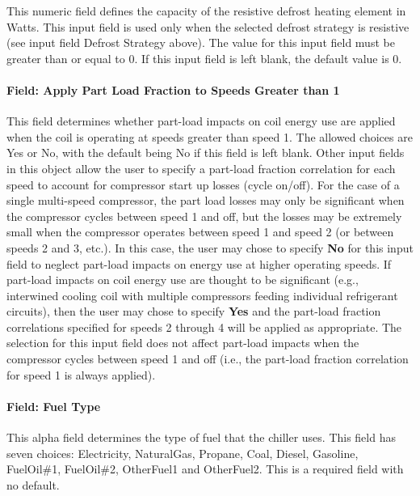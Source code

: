 This numeric field defines the capacity of the resistive defrost heating element in Watts. This input field is used only when the selected defrost strategy is resistive (see input field Defrost Strategy above). The value for this input field must be greater than or equal to 0. If this input field is left blank, the default value is 0.

\paragraph{Field: Apply Part Load Fraction to Speeds Greater than 1}\label{field-apply-part-load-fraction-to-speeds-greater-than-1-1}

This field determines whether part-load impacts on coil energy use are applied when the coil is operating at speeds greater than speed 1. The allowed choices are Yes or No, with the default being No if this field is left blank. Other input fields in this object allow the user to specify a part-load fraction correlation for each speed to account for compressor start up losses (cycle on/off). For the case of a single multi-speed compressor, the part load losses may only be significant when the compressor cycles between speed 1 and off, but the losses may be extremely small when the compressor operates between speed 1 and speed 2 (or between speeds 2 and 3, etc.). In this case, the user may chose to specify \textbf{No} for this input field to neglect part-load impacts on energy use at higher operating speeds. If part-load impacts on coil energy use are thought to be significant (e.g., interwined cooling coil with multiple compressors feeding individual refrigerant circuits), then the user may chose to specify \textbf{Yes} and the part-load fraction correlations specified for speeds 2 through 4 will be applied as appropriate. The selection for this input field does not affect part-load impacts when the compressor cycles between speed 1 and off (i.e., the part-load fraction correlation for speed 1 is always applied).

\paragraph{Field: Fuel Type}\label{field-fuel-type-1-000}

This alpha field determines the type of fuel that the chiller uses. This field has seven choices: Electricity, NaturalGas, Propane, Coal, Diesel, Gasoline, FuelOil\#1, FuelOil\#2, OtherFuel1 and OtherFuel2. This is a required field with no default.

